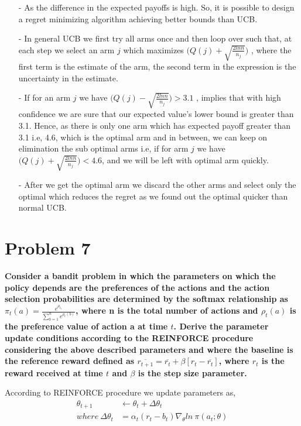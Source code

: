 \documentclass [11pt]{article}
\numberwithin{equation}{section}
\begin{document}
\begin{itemize}
    \item[-] As the difference in the expected payoffs is high. So, it is possible to design a regret minimizing algorithm achieving better bounds than UCB. 
    \item[-] In general UCB we first try all arms once and then loop over such that, at each step we select an arm $j$ which maximizes $ \bigg( Q(j) + \sqrt{\frac{2ln n}{n_j}} \bigg)$ , where the first term is the estimate of the arm, the second term in the expression is the uncertainty in the estimate.
    \item[-] If for an arm $j$ we have $ \bigg( Q(j) - \sqrt{\frac{2ln n}{n_j}} \bigg) > 3.1  $ , implies that with high confidence we are sure that our expected value's lower bound is greater than 3.1. Hence, as there is only one arm which has expected payoff greater than 3.1 i.e, 4.6, which is the optimal arm and in between, we can keep on elimination the sub optimal arms i.e,  if for arm $j$ we have $\bigg( Q(j) + \sqrt{\frac{2ln n}{n_j}} \bigg) < 4.6$, and we will be left with optimal arm quickly.
    \item[-] After we get the optimal arm we discard the other arms and select only the optimal which reduces the regret as we found out the optimal quicker than normal UCB.
\end{itemize}

\vspace{0.5cm}

\section*{Problem 7}
\textbf{Consider a bandit problem in which the parameters on which the policy depends are the preferences of the actions and the action selection probabilities are determined by the softmax relationship as $\pi_t (a) = \frac{e^{\rho_t_t}}{\sum_{b=1}^{n}e^{\rho_t(b)}} $, where n is the total number of actions and $ \rho_t(a)$ is the preference value of action a at time $t$. Derive the parameter update conditions according to the REINFORCE procedure considering the above described parameters and where the baseline is the reference reward defined as $ \overline{r_{t+1}} = \overline{r_t} + \beta [r{_t} - \overline{r_t} ]$, where $r_t$ is the reward received at time $t$ and $\beta$ is the step size parameter.}

According to REINFORCE procedure we update parameters as, 
\begin{align*}
    \theta_{t+1} &\leftarrow \theta_{t} + \Delta\theta_{t} \\
where \ \Delta\theta_t &= \alpha_t (r_t - b_t) \nabla_\theta ln \ \pi(a_t;\theta)   
\end{align*}    
\end{document}
